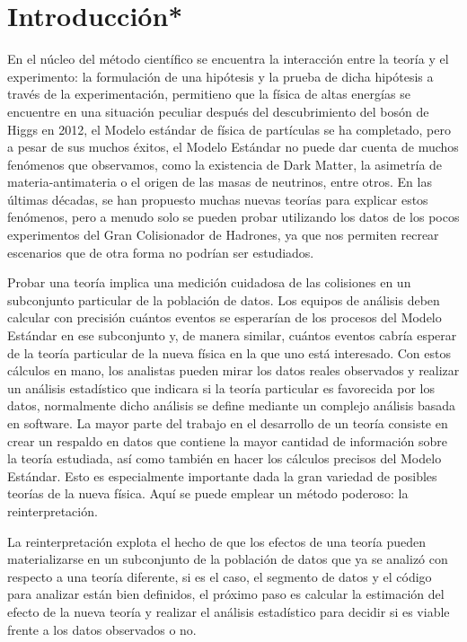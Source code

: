 \chapter*{Introducción*}
En el núcleo del método científico se encuentra la interacción entre la teoría y el experimento: la formulación de una hipótesis y la prueba de dicha hipótesis a través de la experimentación, permitieno que la física de altas energías se encuentre en una situación peculiar después del descubrimiento del bosón de Higgs en 2012, el Modelo estándar de física de partículas se ha completado, pero a pesar de sus muchos éxitos, el Modelo Estándar no puede dar cuenta de muchos fenómenos que observamos, como la existencia de Dark Matter, la asimetría de materia-antimateria o el origen de las masas de neutrinos, entre otros. En las últimas décadas, se han propuesto muchas nuevas teorías para explicar estos fenómenos, pero a menudo solo se pueden probar utilizando los datos de los pocos experimentos del Gran Colisionador de Hadrones, ya que nos permiten recrear escenarios que de otra forma no podrían ser estudiados. 

Probar una teoría implica una medición cuidadosa de las colisiones en un subconjunto particular de la población de datos. Los equipos de análisis deben calcular con precisión cuántos eventos se esperarían de los procesos del Modelo Estándar en ese subconjunto y, de manera similar, cuántos eventos cabría esperar de la teoría particular de la nueva física en la que uno está interesado. Con estos cálculos en mano, los analistas pueden mirar los datos reales observados y realizar un análisis estadístico que indicara si la teoría particular es favorecida por los datos, normalmente dicho análisis se define mediante un complejo análisis basada en software. La mayor parte del trabajo en el desarrollo de un teoría consiste en crear un respaldo en datos que contiene la mayor cantidad de información sobre la teoría estudiada, así como también en hacer los cálculos precisos del Modelo Estándar.
Esto es especialmente importante dada la gran variedad de posibles teorías de la nueva física. Aquí se puede emplear un método poderoso: la reinterpretación.

La reinterpretación explota el hecho de que los efectos de una teoría pueden materializarse en un subconjunto de la población de datos que ya se analizó con respecto a una teoría diferente, si es el caso, el segmento de datos y el código para analizar están bien definidos, el próximo paso es calcular la estimación del efecto de la nueva teoría y realizar el análisis estadístico para decidir si es viable frente a los datos observados o no.







